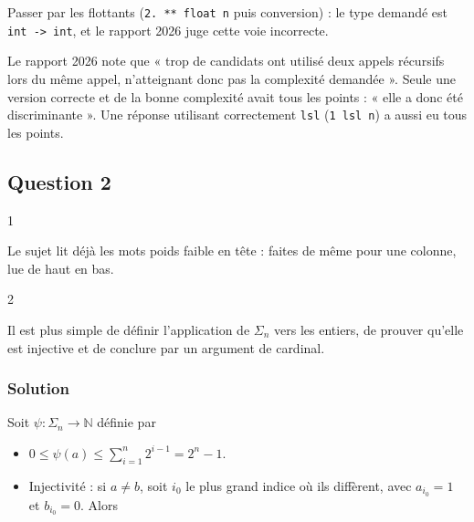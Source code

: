 \documentclass[11pt,a4paper]{article}
\providecommand{\tightlist}{\setlength{\itemsep}{0pt}\setlength{\parskip}{0pt}}
\newcommand{\equationajustee}[1]{%
  \sbox{\boiteequation}{$\displaystyle #1$}%
  \ifdim\wd\boiteequation>\linewidth
    \[\resizebox{\linewidth}{!}{\usebox{\boiteequation}}\]%
  \else
    \[#1\]%
  \fi}
\begin{document}
\begin{piege}

Passer par les flottants (\texttt{2.\ **\ float\ n} puis conversion) : le type demandé est \texttt{int\ -\textgreater{}\ int}, et le rapport 2026 juge cette voie incorrecte.

\end{piege}

\begin{jury}

Le rapport 2026 note que « trop de candidats ont utilisé deux appels récursifs lors du même appel, n'atteignant donc pas la complexité demandée ». Seule une version correcte et de la bonne complexité avait tous les points : « elle a donc été discriminante ». Une réponse utilisant correctement \texttt{lsl} (\texttt{1\ lsl\ n}) a aussi eu tous les points.

\end{jury}

\hypertarget{question-2}{%
\subsection{Question 2}\label{question-2}}

\begin{indication}{1}

Le sujet lit déjà les mots poids faible en tête : faites de même pour une colonne, lue de haut en bas.

\end{indication}

\begin{indication}{2}

Il est plus simple de définir l'application de \(\Sigma_n\) vers les entiers, de prouver qu'elle est injective et de conclure par un argument de cardinal.

\end{indication}

\hypertarget{solution-1}{%
\subsubsection{Solution}\label{solution-1}}

Soit \(\psi:\Sigma_n\to\mathbb{N}\) définie par

\equationajustee{\psi(a_1,\dots,a_n)=\sum_{i=1}^n2^{i-1}a_i.}

\begin{itemize}
\tightlist
\item
  \(0\le\psi(a)\le\sum_{i=1}^n2^{i-1}=2^n-1\).
\item
  Injectivité : si \(a\ne b\), soit \(i_0\) le plus grand indice où ils diffèrent, avec \(a_{i_0}=1\) et \(b_{i_0}=0\). Alors
\end{itemize}
\end{document}
